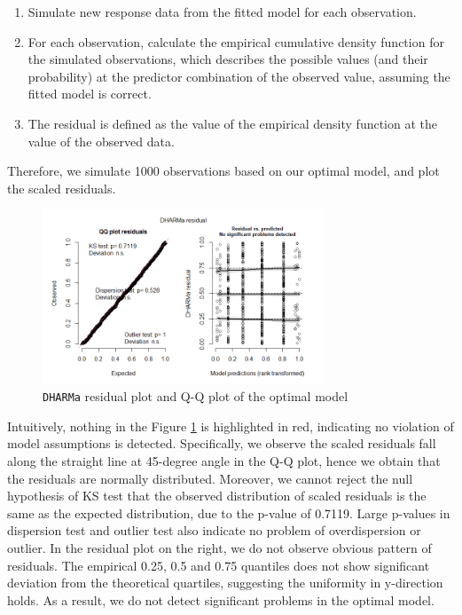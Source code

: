 \documentclass[11pt,twoside]{article}
\numberwithin{Theorem}{section}
\numberwithin{Definition}{section}
\numberwithin{Lemma}{section}
\numberwithin{Algorithm}{section}
\numberwithin{equation}{section}
\begin{document}
\begin{enumerate}
	\item Simulate new response data from the fitted model for each observation.
	\item For each observation, calculate the empirical cumulative density function for the simulated observations, which describes the possible values (and their probability) at the predictor combination of the observed value, assuming the fitted model is correct.
	\item The residual is defined as the value of the empirical density function at the value of the observed data.
\end{enumerate}

Therefore, we simulate 1000 observations based on our optimal model, and plot the scaled residuals.

\begin{figure}[!h]
	\centering
	\includegraphics[width = 0.75\textwidth]{Images/diagnosis1.png}
	\caption{\texttt{DHARMa} residual plot and Q-Q plot of the optimal model}
	\label{fig:diagnosis1}
\end{figure}

Intuitively, nothing in the Figure \ref{fig:diagnosis1} is highlighted in red, indicating no violation of model assumptions is detected. Specifically, we observe the scaled residuals fall along the straight line at 45-degree angle in the Q-Q plot, hence we obtain that the residuals are normally distributed. Moreover, we cannot reject the null hypothesis of KS test that the observed distribution of scaled residuals is the same as the expected distribution, due to the p-value of 0.7119. Large p-values in dispersion test and outlier test also indicate no problem of overdispersion or outlier. In the residual plot on the right, we do not observe obvious pattern of residuals. The empirical 0.25, 0.5 and 0.75 quantiles does not show significant deviation from the theoretical quartiles, suggesting the uniformity in y-direction holds. As a result, we do not detect significant problems in the optimal model.
\end{document}
